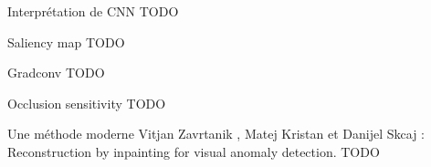 \begin{frame}{Interprétation de CNN}
  \alert{TODO}
\end{frame}

\begin{frame}{Saliency map}
    \alert{TODO}
\end{frame}

\begin{frame}{Gradconv}
    \alert{TODO}
\end{frame}

\begin{frame}{Occlusion sensitivity}
  \alert{TODO}
\end{frame}

\begin{frame}{Une méthode moderne}
  Vitjan Zavrtanik , Matej Kristan et Danijel Skcaj : Reconstruction by inpainting for visual anomaly detection.
  \alert{TODO}
\end{frame}
  